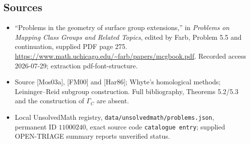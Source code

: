 \documentclass[11pt]{article}
\begin{document}
\subsection{Sources}
\begin{itemize}
\item ``Problems in the geometry of surface group extensions,'' in \emph{Problems on Mapping Class Groups and Related Topics}, edited by Farb, Problem 5.5 and continuation, supplied PDF page 275. \url{https://www.math.uchicago.edu/~farb/papers/mcgbook.pdf}. Recorded access 2026-07-29; extraction pdf-font-structure.
\item Source [Mos03a], [FM00] and [Har86]; Whyte's homological methods; Leininger--Reid subgroup construction. Full bibliography, Theorems 5.2/5.3 and the construction of \(\Gamma_C\) are absent.
\item Local UnsolvedMath registry, \texttt{data/unsolvedmath/problems.json}, permanent ID \(11000240\), exact source code \texttt{catalogue entry}; supplied OPEN-TRIAGE summary reports unverified status.
\end{itemize}
\end{document}
